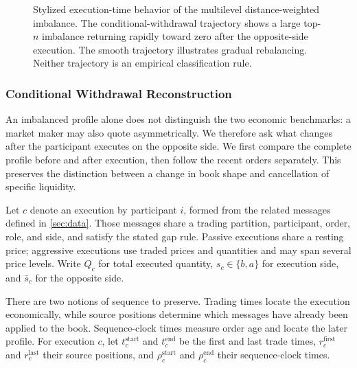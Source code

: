 \documentclass[11pt]{article}
\begin{document}
\begin{figure}[htbp]
    \caption{Stylized execution-time behavior of the multilevel distance-weighted imbalance. The conditional-withdrawal
    trajectory shows a large top-$n$ imbalance returning rapidly toward zero after the opposite-side execution. The smooth
    trajectory illustrates gradual rebalancing. Neither trajectory is an empirical classification rule.}
    \label{fig:topn_imbalance_dynamics}
\end{figure}
\FloatBarrier

\subsubsection{Conditional Withdrawal Reconstruction}
\label{subsec:multilevel_conditionality}

An imbalanced profile alone does not distinguish the two economic benchmarks: a market maker may also quote asymmetrically. We therefore ask what changes after the participant executes on the opposite side. We first compare the complete profile before and after execution, then follow the recent orders separately. This preserves the distinction between a change in book shape and cancellation of specific liquidity.

Let $c$ denote an execution by participant $i$, formed from the related messages defined in \cref{sec:data}.
Those messages share a trading partition, participant, order, role, and side, and satisfy the stated gap rule.
Passive executions share a resting price; aggressive executions use traded prices and quantities and may span several
price levels. Write $Q_c$ for total executed quantity, $s_c\in\{b,a\}$ for execution side, and $\bar{s}_c$ for the opposite side.

There are two notions of sequence to preserve. Trading times locate the execution economically, while source positions determine which messages have already been applied to the book. Sequence-clock times measure order age and locate the later profile. For execution $c$, let $t_c^{\mathrm{start}}$ and $t_c^{\mathrm{end}}$ be the first and last trade times, $r_c^{\mathrm{first}}$ and $r_c^{\mathrm{last}}$ their source positions, and $\rho_c^{\mathrm{start}}$ and $\rho_c^{\mathrm{end}}$ their sequence-clock times.
\end{document}
